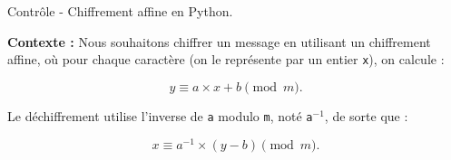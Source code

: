 \documentclass[12pt,a4paper]{article}
\begin{document}
\begin{center}
  \Large
  Contrôle - Chiffrement affine en Python.
\end{center}

\vfill

\begin{tcolorbox}
  
\textbf{Contexte :}  
Nous souhaitons chiffrer un message en utilisant un chiffrement affine, où pour chaque caractère
(on le représente par un entier \texttt{x}), on calcule :

\[
y \equiv a \times x + b \pmod{m}.
\]

Le déchiffrement utilise l'inverse de \texttt{a} modulo \texttt{m}, noté \texttt{a\(^{-1}\)}, de sorte que :

\[
x \equiv a^{-1} \times (y - b) \pmod{m}.
\]
\end{tcolorbox}

%

\vfill
\end{document}
